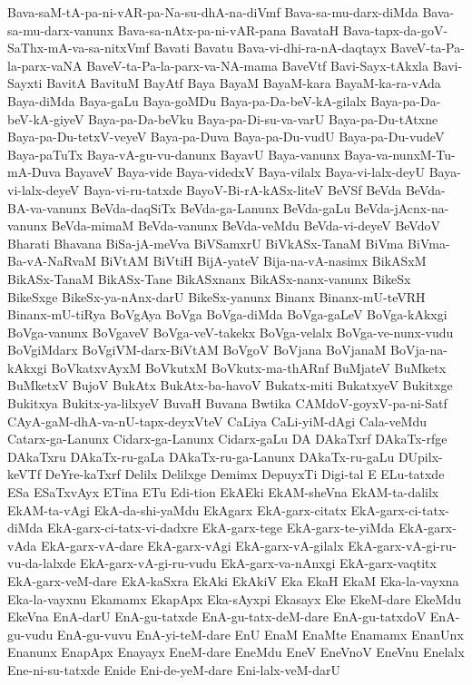 {Bava-saM-tA-pa-ni-vAR-pa-Na-su-dhA-na-diVmf
Bava-sa-mu-darx-diMda
Bava-sa-mu-darx-vanunx
Bava-sa-nAtx-pa-ni-vAR-pana
BavataH
Bava-tapx-da-goV-SaThx-mA-va-sa-nitxVmf
Bavati
Bavatu
Bava-vi-dhi-ra-nA-daqtayx
BaveV-ta-Pa-la-parx-vaNA
BaveV-ta-Pa-la-parx-va-NA-mama
BaveVtf
Bavi-Sayx-tAkxla
Bavi-Sayxti
BavitA
BavituM
BayAtf
Baya
BayaM
BayaM-kara
BayaM-ka-ra-vAda
Baya-diMda
Baya-gaLu
Baya-goMDu
Baya-pa-Da-beV-kA-gilalx
Baya-pa-Da-beV-kA-giyeV
Baya-pa-Da-beVku
Baya-pa-Di-su-va-varU
Baya-pa-Du-tAtxne
Baya-pa-Du-tetxV-veyeV
Baya-pa-Duva
Baya-pa-Du-vudU
Baya-pa-Du-vudeV
Baya-paTuTx
Baya-vA-gu-vu-danunx
BayavU
Baya-vanunx
Baya-va-nunxM-Tu-mA-Duva
BayaveV
Baya-vide
Baya-videdxV
Baya-vilalx
Baya-vi-lalx-deyU
Baya-vi-lalx-deyeV
Baya-vi-ru-tatxde
BayoV-Bi-rA-kASx-liteV
BeVSf
BeVda
BeVda-BA-va-vanunx
BeVda-daqSiTx
BeVda-ga-Lanunx
BeVda-gaLu
BeVda-jAcnx-na-vanunx
BeVda-mimaM
BeVda-vanunx
BeVda-veMdu
BeVda-vi-deyeV
BeVdoV
Bharati
Bhavana
BiSa-jA-meVva
BiVSamxrU
BiVkASx-TanaM
BiVma
BiVma-Ba-vA-NaRvaM
BiVtAM
BiVtiH
BijA-yateV
Bija-na-vA-nasimx
BikASxM
BikASx-TanaM
BikASx-Tane
BikASxnanx
BikASx-nanx-vanunx
BikeSx
BikeSxge
BikeSx-ya-nAnx-darU
BikeSx-yanunx
Binanx
Binanx-mU-teVRH
Binanx-mU-tiRya
BoVgAya
BoVga
BoVga-diMda
BoVga-gaLeV
BoVga-kAkxgi
BoVga-vanunx
BoVgaveV
BoVga-veV-takekx
BoVga-velalx
BoVga-ve-nunx-vudu
BoVgiMdarx
BoVgiVM-darx-BiVtAM
BoVgoV
BoVjana
BoVjanaM
BoVja-na-kAkxgi
BoVkatxvAyxM
BoVkutxM
BoVkutx-ma-thARnf
BuMjateV
BuMketx
BuMketxV
BujoV
BukAtx
BukAtx-ba-havoV
Bukatx-miti
BukatxyeV
Bukitxge
Bukitxya
Bukitx-ya-lilxyeV
BuvaH
Buvana
Bwtika
CAMdoV-goyxV-pa-ni-Satf
CAyA-gaM-dhA-va-nU-tapx-deyxVteV
CaLiya
CaLi-yiM-dAgi
Cala-veMdu
Catarx-ga-Lanunx
Cidarx-ga-Lanunx
Cidarx-gaLu
DA
DAkaTxrf
DAkaTx-rfge
DAkaTxru
DAkaTx-ru-gaLa
DAkaTx-ru-ga-Lanunx
DAkaTx-ru-gaLu
DUpilx-keVTf
DeYre-kaTxrf
Delilx
Delilxge
Demimx
DepuyxTi
Digi-tal
E
ELu-tatxde
ESa
ESaTxvAyx
ETina
ETu
Edi-tion
EkAEki
EkAM-sheVna
EkAM-ta-dalilx
EkAM-ta-vAgi
EkA-da-shi-yaMdu
EkAgarx
EkA-garx-citatx
EkA-garx-ci-tatx-diMda
EkA-garx-ci-tatx-vi-dadxre
EkA-garx-tege
EkA-garx-te-yiMda
EkA-garx-vAda
EkA-garx-vA-dare
EkA-garx-vAgi
EkA-garx-vA-gilalx
EkA-garx-vA-gi-ru-vu-da-lalxde
EkA-garx-vA-gi-ru-vudu
EkA-garx-va-nAnxgi
EkA-garx-vaqtitx
EkA-garx-veM-dare
EkA-kaSxra
EkAki
EkAkiV
Eka
EkaH
EkaM
Eka-la-vayxna
Eka-la-vayxnu
Ekamamx
EkapApx
Eka-sAyxpi
Ekasayx
Eke
EkeM-dare
EkeMdu
EkeVna
EnA-darU
EnA-gu-tatxde
EnA-gu-tatx-deM-dare
EnA-gu-tatxdoV
EnA-gu-vudu
EnA-gu-vuvu
EnA-yi-teM-dare
EnU
EnaM
EnaMte
Enamamx
EnanUnx
Enanunx
EnapApx
Enayayx
EneM-dare
EneMdu
EneV
EneVnoV
EneVnu
Enelalx
Ene-ni-su-tatxde
Enide
Eni-de-yeM-dare
Eni-lalx-veM-darU
}

